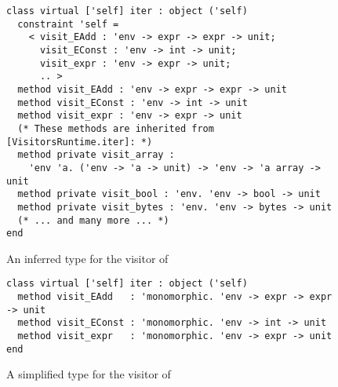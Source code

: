\begin{figure}[t]
\begin{mdframed}[backgroundcolor=green!10]
\begin{lstlisting}
class virtual ['self] iter : object ('self)
  constraint 'self =
    < visit_EAdd : 'env -> expr -> expr -> unit;
      visit_EConst : 'env -> int -> unit;
      visit_expr : 'env -> expr -> unit;
      .. >
  method visit_EAdd : 'env -> expr -> expr -> unit
  method visit_EConst : 'env -> int -> unit
  method visit_expr : 'env -> expr -> unit
  (* These methods are inherited from [VisitorsRuntime.iter]: *)
  method private visit_array :
    'env 'a. ('env -> 'a -> unit) -> 'env -> 'a array -> unit
  method private visit_bool : 'env. 'env -> bool -> unit
  method private visit_bytes : 'env. 'env -> bytes -> unit
  (* ... and many more ... *)
end
\end{lstlisting}
\end{mdframed}
\caption{An inferred type for the \iter visitor of }
\label{fig:inferred}
\end{figure}

\begin{figure}[t]
\begin{mdframed}[backgroundcolor=green!10]
\begin{lstlisting}
class virtual ['self] iter : object ('self)
  method visit_EAdd   : 'monomorphic. 'env -> expr -> expr -> unit
  method visit_EConst : 'monomorphic. 'env -> int -> unit
  method visit_expr   : 'monomorphic. 'env -> expr -> unit
end
\end{lstlisting}
\end{mdframed}
\caption{A simplified type for the \iter visitor of }
\label{fig:simplified}
\end{figure}

